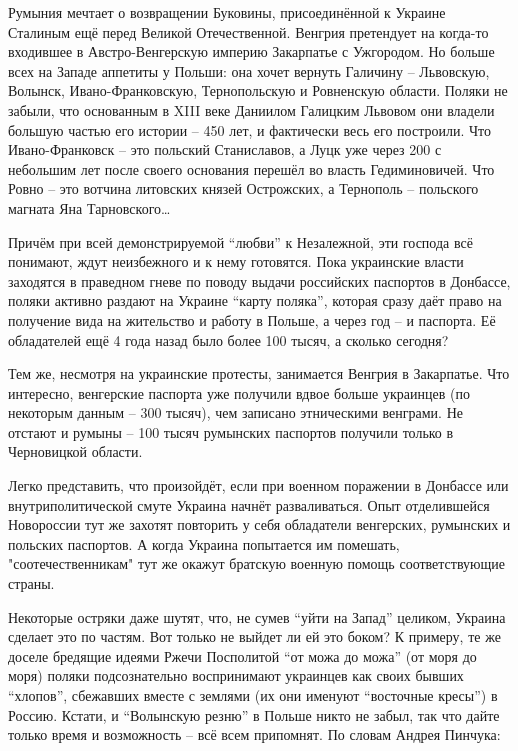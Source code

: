 Румыния мечтает о возвращении Буковины, присоединённой к Украине Сталиным ещё
перед Великой Отечественной. Венгрия претендует на когда-то входившее в
Австро-Венгерскую империю Закарпатье с Ужгородом. Но больше всех на Западе
аппетиты у Польши: она хочет вернуть Галичину – Львовскую, Волынск,
Ивано-Франковскую, Тернопольскую и Ровненскую области. Поляки не забыли, что
основанным в XIII веке Даниилом Галицким Львовом они владели большую частью его
истории – 450 лет, и фактически весь его построили. Что Ивано-Франковск – это
польский Станиславов, а Луцк уже через 200 с небольшим лет после своего
основания перешёл во власть Гедиминовичей. Что Ровно – это вотчина литовских
князей Острожских, а Тернополь – польского магната Яна Тарновского…

Причём при всей демонстрируемой \enquote{любви} к Незалежной, эти господа всё понимают,
ждут неизбежного и к нему готовятся. Пока украинские власти заходятся в
праведном гневе по поводу выдачи российских паспортов в Донбассе, поляки
активно раздают на Украине \enquote{карту поляка}, которая сразу даёт право на
получение вида на жительство и работу в Польше, а через год – и паспорта. Её
обладателей ещё 4 года назад было более 100 тысяч, а сколько сегодня?

Тем же, несмотря на украинские протесты, занимается Венгрия в Закарпатье. Что
интересно, венгерские паспорта уже получили вдвое больше украинцев (по
некоторым данным – 300 тысяч), чем записано этническими венграми. Не отстают и
румыны – 100 тысяч румынских паспортов получили только в Черновицкой области.

Легко представить, что произойдёт, если при военном поражении в Донбассе или
внутриполитической смуте Украина начнёт разваливаться. Опыт отделившейся
Новороссии тут же захотят повторить у себя обладатели венгерских, румынских и
польских паспортов. А когда Украина попытается им помешать, "соотечественникам"
тут же окажут братскую военную помощь соответствующие страны.

Некоторые остряки даже шутят, что, не сумев \enquote{уйти на Запад} целиком, Украина
сделает это по частям. Вот только не выйдет ли ей это боком? К примеру, те же
доселе бредящие идеями Ржечи Посполитой \enquote{от можа до можа} (от моря до моря)
поляки подсознательно воспринимают украинцев как своих бывших \enquote{хлопов},
сбежавших вместе с землями (их они именуют \enquote{восточные кресы}) в Россию. Кстати,
и \enquote{Волынскую резню} в Польше никто не забыл, так что дайте только время и
возможность – всё всем припомнят. По словам Андрея Пинчука:


